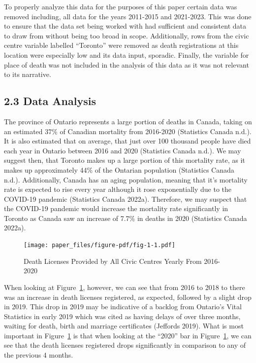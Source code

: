 \documentclass[
  letterpaper,
  DIV=11,
  numbers=noendperiod]{scrartcl}
\begin{document}
To properly analyze this data for the purposes of this paper certain
data was removed including, all data for the years 2011-2015 and
2021-2023. This was done to ensure that the data set being worked with
had sufficient and consistent data to draw from without being too broad
in scope. Additionally, rows from the civic centre variable labelled
``Toronto'' were removed as death registrations at this location were
especially low and its data input, sporadic. Finally, the variable for
place of death was not included in the analysis of this data as it was
not relevant to its narrative.

\hypertarget{data-analysis}{%
\subsection{2.3 Data Analysis}\label{data-analysis}}

The province of Ontario represents a large portion of deaths in Canada,
taking on an estimated 37\% of Canadian mortality from 2016-2020
(Statistics Canada n.d.). It is also estimated that on average, that
just over 100 thousand people have died each year in Ontario between
2016 and 2020 (Statistics Canada n.d.). We may suggest then, that
Toronto makes up a large portion of this mortality rate, as it makes up
approximately 44\% of the Ontarian population (Statistics Canada n.d.).
Additionally, Canada has an aging population, meaning that it's
mortality rate is expected to rise every year although it rose
exponentially due to the COVID-19 pandemic (Statistics Canada 2022a).
Therefore, we may suspect that the COVID-19 pandemic would increase the
mortality rate significantly in Toronto as Canada saw an increase of
7.7\% in deaths in 2020 (Statistics Canada 2022a).

\begin{figure}

\caption{\label{fig-1}Death Licenses Provided by All Civic Centres
Yearly From 2016-2020}

{\centering \texttt{[image: paper\_files/figure-pdf/fig-1-1.pdf]}

}

\end{figure}

When looking at Figure~\ref{fig-1}, however, we can see that from 2016
to 2018 to there was an increase in death licenses registered, as
expected, followed by a slight drop in 2019. This drop in 2019 may be
indicative of a backlog from Ontario's Vital Statistics in early 2019
which was cited as having delays of over three months, waiting for
death, birth and marriage certificates (Jeffords 2019). What is most
important in Figure~\ref{fig-1} is that when looking at the ``2020'' bar
in Figure~\ref{fig-1}, we can see that the death licenses registered
drops significantly in comparison to any of the previous 4 months.
\end{document}
